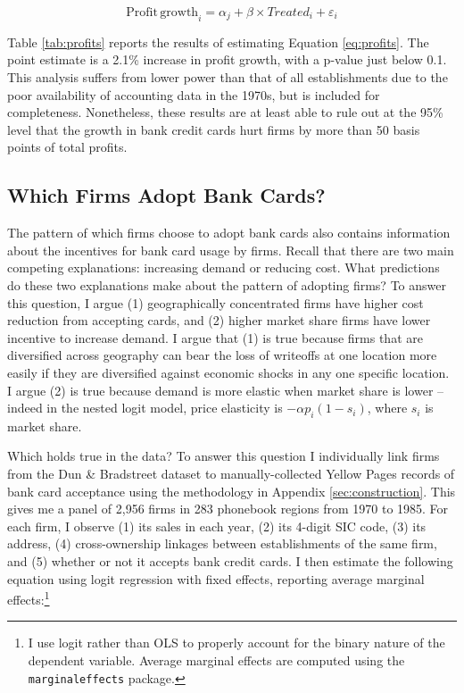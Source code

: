 \documentclass[12pt,english]{article}
\begin{document}
\begin{equation}\label{eq:profits}
\mathrm{Profit\,growth}_{i}= \alpha_{j} + \beta \times Treated_{i} +  \varepsilon_{i}
\end{equation}
 
\begin{table}[!ht]\label{tab:profits}
\caption{Difference-in-Difference of Accounting Profits}\label{tab:profits}


\end{table}

Table \ref{tab:profits} reports the results of estimating Equation \ref{eq:profits}. The point estimate is a 2.1\% increase in profit growth, with a p-value just below 0.1. This analysis suffers from lower power than that of all establishments due to the poor availability of accounting data in the 1970s, but is included for completeness. Nonetheless, these results are at least able to rule out at the 95\% level that the growth in bank credit cards hurt firms by more than 50 basis points of total profits. 

\subsection{Which Firms Adopt Bank Cards?}\label{sec:adoption_firms}

The pattern of which firms choose to adopt bank cards also contains information about the incentives for bank card usage by firms. Recall that there are two main competing explanations: increasing demand or reducing cost. What predictions do these two explanations make about the pattern of adopting firms? To answer this question, I argue (1) geographically concentrated firms have higher cost reduction from accepting cards, and (2) higher market share firms have lower incentive to increase demand. I argue that (1) is true because firms that are diversified across geography can bear the loss of writeoffs at one location more easily if they are diversified against economic shocks in any one specific location. I argue (2) is true because demand is more elastic when market share is lower -- indeed in the nested logit model, price elasticity is $-\alpha p_i \left(1 - s_i\right)$, where $s_i$ is market share.

Which holds true in the data? To answer this question I individually link firms from the Dun \& Bradstreet dataset to manually-collected Yellow Pages records of bank card acceptance using the methodology in Appendix \ref{sec:construction}. This gives me a panel of 2,956 firms in 283 phonebook regions from 1970 to 1985. For each firm, I observe (1) its sales in each year, (2) its 4-digit SIC code, (3) its address, (4) cross-ownership linkages between establishments of the same firm, and (5) whether or not it accepts bank credit cards. I then estimate the following equation using logit regression with fixed effects, reporting average marginal effects:\footnote{I use logit rather than OLS to properly account for the binary nature of the dependent variable. Average marginal effects are computed using the \texttt{marginaleffects} package.}
\end{document}
